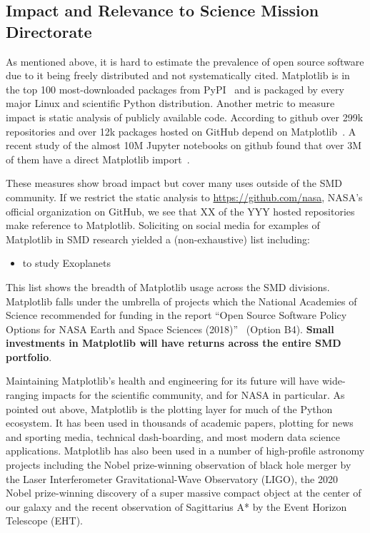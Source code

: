 \documentclass[12pt]{article}
\numberwithin{page}{section}
\begin{document}
\subsection{Impact and Relevance to Science Mission Directorate}



As mentioned above, it is hard to estimate the prevalence of open
source software due to it being freely distributed and not
systematically cited.  Matplotlib is in the top 100 most-downloaded
packages from PyPI~\cite{pypi_stats} and is packaged by every major
Linux and scientific Python distribution.  Another metric to measure
impact is static analysis of publicly available code.  According to
github over 299k repositories and over 12k packages hosted on GitHub
depend on Matplotlib~\cite{gh_deps:2021}. A recent study of the
almost 10M Jupyter notebooks on github found that over 3M of them have
a direct Matplotlib import~\cite{datalore:2020}.




These measures show broad impact but cover many uses outside of the
SMD community.  If we restrict the static analysis to
\url{https://github.com/nasa}, NASA's official organization on GitHub,
we see that XX of the YYY hosted repositories make reference to
Matplotlib.  Soliciting on social media for examples of Matplotlib in SMD research
yielded a (non-exhaustive) list including:
\begin{itemize}[noitemsep]
\item  to study Exoplanets \cite{2020AJ....160..116G}
\end{itemize}
This list shows the breadth of Matplotlib usage across the SMD
divisions.  Matplotlib falls under the umbrella of projects which the
National Academies of Science recommended for funding in the report
``Open Source Software Policy Options for NASA Earth and Space
Sciences (2018)''~\cite{NAP25217} (Option B4).
\textbf{Small investments in Matplotlib will have returns across the
  entire SMD portfolio}.

Maintaining Matplotlib's health and engineering for its future will
have wide-ranging impacts for the scientific community, and for NASA in
particular.  As pointed out above, Matplotlib is the plotting layer
for much of the Python ecosystem.  It has been used in thousands of
academic papers, plotting for news and sporting media, technical
dash-boarding, and most modern data science applications.
Matplotlib has also been used in a number
of high-profile astronomy projects including the Nobel prize-winning
observation of black hole merger by the Laser Interferometer
Gravitational-Wave Observatory (LIGO), the 2020 Nobel prize-winning
discovery of a super massive compact object at the center of our
galaxy and the recent observation of Sagittarius A* by the Event
Horizon Telescope (EHT).
\end{document}
